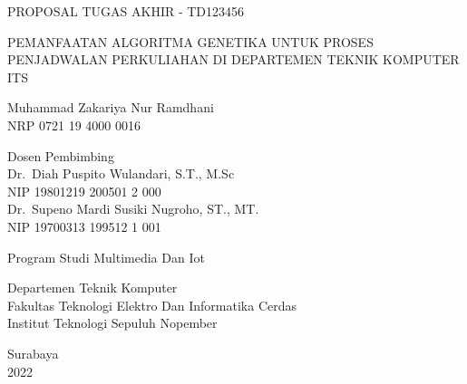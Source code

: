 \begin{large}
  PROPOSAL TUGAS AKHIR - TD123456
\end{large}

\vspace{\fill}

\begin{spacing}{1.5}
  \begin{Large}
    PEMANFAATAN ALGORITMA GENETIKA UNTUK 
    PROSES PENJADWALAN PERKULIAHAN DI 
    DEPARTEMEN TEKNIK KOMPUTER ITS
  \end{Large}
\end{spacing}

\vspace{\fill}

\begin{large}
  Muhammad Zakariya Nur Ramdhani \\
  \textmd{NRP 0721 19 4000 0016}
\end{large}

\vspace{\fill}

\begin{large}
  \textmd{Dosen Pembimbing} \\
  Dr.\ Diah Puspito Wulandari, S.T., M.Sc\\
  \textmd{NIP 19801219 200501 2 000} \\
  Dr.\ Supeno Mardi Susiki Nugroho, ST., MT. \\
  \textmd{NIP 19700313 199512 1 001}
\end{large}

\vspace{\fill}

Program Studi Multimedia Dan Iot \\

\mdseries

Departemen Teknik Komputer \\
Fakultas Teknologi Elektro Dan Informatika Cerdas\\
Institut Teknologi Sepuluh Nopember

Surabaya \\
2022
